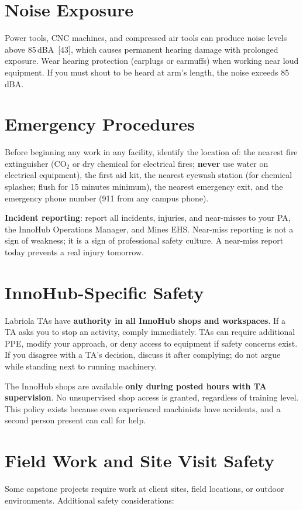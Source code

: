 \section{Noise Exposure}
Power tools, CNC machines, and compressed air tools can produce noise levels above 85\,dBA~[43], which causes permanent hearing damage with prolonged exposure. Wear hearing protection (earplugs or earmuffs) when working near loud equipment. If you must shout to be heard at arm's length, the noise exceeds 85\,dBA.

\section{Emergency Procedures}
Before beginning any work in any facility, identify the location of: the nearest fire extinguisher (CO$_2$ or dry chemical for electrical fires; \textbf{never} use water on electrical equipment), the first aid kit, the nearest eyewash station (for chemical splashes; flush for 15 minutes minimum), the nearest emergency exit, and the emergency phone number (911 from any campus phone).

\textbf{Incident reporting}: report all incidents, injuries, and near-misses to your PA, the InnoHub Operations Manager, and Mines EHS. Near-miss reporting is not a sign of weakness; it is a sign of professional safety culture. A near-miss report today prevents a real injury tomorrow.

\section{InnoHub-Specific Safety}
Labriola TAs have \textbf{authority in all InnoHub shops and workspaces}. If a TA asks you to stop an activity, comply immediately. TAs can require additional PPE, modify your approach, or deny access to equipment if safety concerns exist. If you disagree with a TA's decision, discuss it after complying; do not argue while standing next to running machinery.

The InnoHub shops are available \textbf{only during posted hours with TA supervision}. No unsupervised shop access is granted, regardless of training level. This policy exists because even experienced machinists have accidents, and a second person present can call for help.


\section{Field Work and Site Visit Safety}
Some capstone projects require work at client sites, field locations, or outdoor environments. Additional safety considerations:

